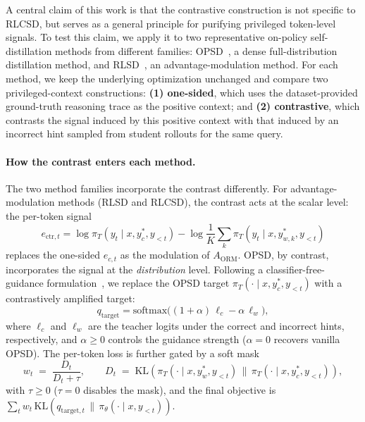 A central claim of this work is that the contrastive construction is not specific to RLCSD, but serves as a general principle for purifying privileged token-level signals. To test this claim, we apply it to two representative on-policy self-distillation methods from different families: OPSD~\citep{zhao2026self}, a dense full-distribution distillation method, and RLSD~\citep{yang2026self}, an advantage-modulation method. For each method, we keep the underlying optimization unchanged and compare two privileged-context constructions: \textbf{(1) one-sided}, which uses the dataset-provided ground-truth reasoning trace as the positive context; and \textbf{(2) contrastive}, which contrasts the signal induced by this positive context with that induced by an incorrect hint sampled from student rollouts for the same query.

\paragraph{How the contrast enters each method.}
The two method families incorporate the contrast differently. For advantage-modulation methods (RLSD and RLCSD), the contrast acts at the scalar level: the per-token signal
\[
e_{\mathrm{ctr},t} = \log \pi_T(y_t\mid x, y_c^*, y_{<t}) - \log \frac{1}{K}\sum_k \pi_T(y_t\mid x, y_{w,k}^*, y_{<t})
\]
replaces the one-sided $e_{c,t}$ as the modulation of $A_{\mathrm{ORM}}$. OPSD, by contrast, incorporates the signal at the \emph{distribution} level. Following a classifier-free-guidance formulation~\citep{ho2022classifier}, we replace the OPSD target $\pi_T(\cdot\mid x, y_c^*, y_{<t})$ with a contrastively amplified target:
\begin{equation}
q_{\text{target}} = \mathrm{softmax}\big((1+\alpha)\,\ell_c - \alpha\,\ell_w\big),
\end{equation}
where $\ell_c$ and $\ell_w$ are the teacher logits under the correct and incorrect hints, respectively, and $\alpha\ge 0$ controls the guidance strength ($\alpha=0$ recovers vanilla OPSD). The per-token loss is further gated by a soft mask
\begin{equation}
w_t \;=\; \frac{D_t}{D_t + \tau}, \qquad D_t \;=\; \mathrm{KL}\!\left(\pi_T(\cdot\mid x, y_w^*, y_{<t})\,\big\|\,\pi_T(\cdot\mid x, y_c^*, y_{<t})\right),
\end{equation}
with $\tau\!\ge\!0$ ($\tau\!=\!0$ disables the mask), and the final objective is $\sum_t w_t\,\mathrm{KL}(q_{\text{target},t}\,\|\,\pi_{\theta}(\cdot\mid x, y_{<t}))$.

